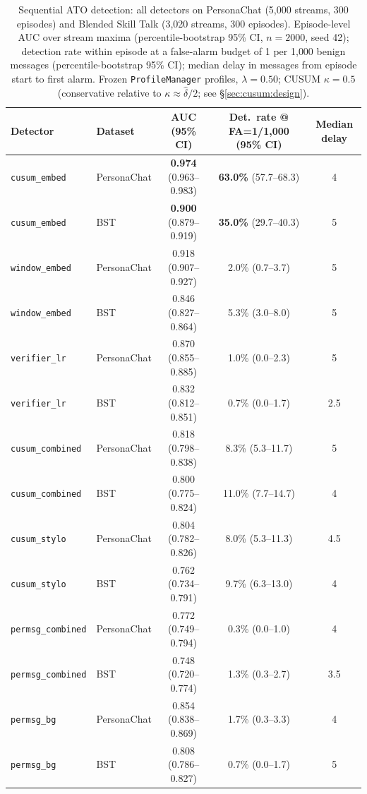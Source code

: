 \documentclass[conference]{IEEEtran}
\begin{document}
\begin{table}[t]
\centering
\caption{Sequential ATO detection: all detectors on PersonaChat (5{,}000 streams,
  300 episodes) and Blended Skill Talk (3{,}020 streams, 300 episodes).
  Episode-level AUC over stream maxima (percentile-bootstrap 95\% CI, $n{=}2000$,
  seed 42);
  detection rate within episode at a false-alarm budget of 1 per 1{,}000 benign
  messages (percentile-bootstrap 95\% CI); median delay in messages from episode
  start to first alarm. Frozen \texttt{ProfileManager} profiles, $\lambda{=}0.50$;
  CUSUM $\kappa{=}0.5$ (conservative relative to $\kappa \approx \hat\delta/2$;
  see \S\ref{sec:cusum:design}).}
\label{tab:cusum}
\setlength{\tabcolsep}{4pt}
\footnotesize
\begin{tabular}{llccc}
\toprule
\textbf{Detector} & \textbf{Dataset} & \textbf{AUC (95\% CI)} &
\textbf{Det.\ rate @ FA=1/1{,}000 (95\% CI)} & \textbf{Median delay} \\
\midrule
\texttt{cusum\_embed}     & PersonaChat & \textbf{0.974} (0.963--0.983) & \textbf{63.0\%} (57.7--68.3) & 4 \\
\texttt{cusum\_embed}     & BST         & \textbf{0.900} (0.879--0.919) & \textbf{35.0\%} (29.7--40.3) & 5 \\
\midrule
\texttt{window\_embed}    & PersonaChat & 0.918 (0.907--0.927) & 2.0\% (0.7--3.7)   & 5 \\
\texttt{window\_embed}    & BST         & 0.846 (0.827--0.864) & 5.3\% (3.0--8.0)   & 5 \\
\texttt{verifier\_lr}     & PersonaChat & 0.870 (0.855--0.885) & 1.0\% (0.0--2.3)   & 5 \\
\texttt{verifier\_lr}     & BST         & 0.832 (0.812--0.851) & 0.7\% (0.0--1.7)   & 2.5 \\
\texttt{cusum\_combined}  & PersonaChat & 0.818 (0.798--0.838) & 8.3\% (5.3--11.7)  & 5 \\
\texttt{cusum\_combined}  & BST         & 0.800 (0.775--0.824) & 11.0\% (7.7--14.7) & 4 \\
\texttt{cusum\_stylo}     & PersonaChat & 0.804 (0.782--0.826) & 8.0\% (5.3--11.3)  & 4.5 \\
\texttt{cusum\_stylo}     & BST         & 0.762 (0.734--0.791) & 9.7\% (6.3--13.0)  & 4 \\
\texttt{permsg\_combined} & PersonaChat & 0.772 (0.749--0.794) & 0.3\% (0.0--1.0)   & 4 \\
\texttt{permsg\_combined} & BST         & 0.748 (0.720--0.774) & 1.3\% (0.3--2.7)   & 3.5 \\
\texttt{permsg\_bg}       & PersonaChat & 0.854 (0.838--0.869) & 1.7\% (0.3--3.3)   & 4 \\
\texttt{permsg\_bg}       & BST         & 0.808 (0.786--0.827) & 0.7\% (0.0--1.7)   & 5 \\
\bottomrule
\end{tabular}
\end{table}
\end{document}
